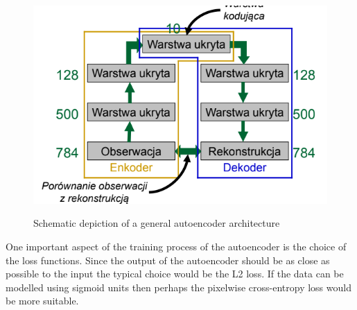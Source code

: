 \documentclass{myclass}
\begin{document}
\begin{figure}[ht]
   \centering
   \includegraphics[width=0.95\columnwidth]{figs/autoencoder.png}
   \label{fig:ae}
   \caption{Schematic depiction of a general autoencoder architecture}
\end{figure}

One important aspect of the training process of the autoencoder is the choice of the loss functions.
Since the output of the autoencoder should be as close as possible to the input the typical choice
would be the L2 loss. If the data can be modelled using sigmoid units then perhaps the pixelwise
cross-entropy loss would be more suitable.


\end{document}
